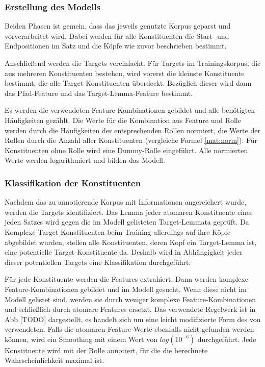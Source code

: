 \documentclass[12pt]{article}
\begin{document}
\subsubsection*{Erstellung des Modells}

Beiden Phasen ist gemein, dass das jeweils genutzte Korpus geparst und vorverarbeitet wird. Dabei werden für alle Konstituenten die Start- und Endpositionen im Satz und die Köpfe wie zuvor beschrieben bestimmt.

Anschließend werden die Targets vereinfacht. Für Targets im Trainingskorpus, die aus mehreren Konstituenten bestehen, wird vorerst die kleinste Konstituente bestimmt, die alle Target-Konstituenten überdeckt. Bezüglich dieser wird dann das Pfad-Feature und das Target-Lemma-Feature bestimmt.

Es werden die verwendeten Feature-Kombinationen gebildet und alle benötigten Häufigkeiten gezählt. Die Werte für die Kombination aus Feature und Rolle werden durch die Häufigkeiten der entsprechenden Rollen normiert, die Werte der Rollen durch die Anzahl aller Konstituenten (vergleiche Formel \eqref{mat:norm}). Für Konstituenten ohne Rolle wird eine Dummy-Rolle eingeführt. Alle normierten Werte werden logarithmiert und bilden das Modell. 

\subsubsection*{Klassifikation der Konstituenten}\label{subsubsec:classify}
Nachdem das zu annotierende Korpus mit Informationen angereichert wurde, werden die Targets identifiziert. Das Lemma jeder atomaren Konstituente eines jeden Satzes wird gegen die im Modell gelisteten Target-Lemmata geprüft. Da Komplexe Target-Konstituenten beim Training allerdings auf ihre Köpfe abgebildet wurden, stellen alle Konstituenten, deren Kopf ein Target-Lemma ist, eine potentielle Target-Konstituente da. Deshalb wird in Abhängigkeit jeder dieser potentiellen Targets eine Klassifikation durchgeführt.

Für jede Konstituente werden die Features extrahiert. Dann werden komplexe Feature-Kombinationen gebildet und im Modell gesucht. Wenn diese nicht im Modell gelistet sind, werden sie durch weniger komplexe Feature-Kombinationen und schließlich durch atomare Features ersetzt. Das verwendete Regelwerk ist in Abb [TODO] dargestellt, es handelt sich um eine leicht modifizierte Form des von \cite{gildea} verwendeten. Falls die atomaren Feature-Werte ebenfalls nicht gefunden werden können, wird ein Smoothing mit einem Wert von $log(10^{-6})$ durchgeführt. Jede Konstituente wird mit der Rolle annotiert, für die die berechnete Wahrscheinlichkeit maximal ist.
\end{document}
